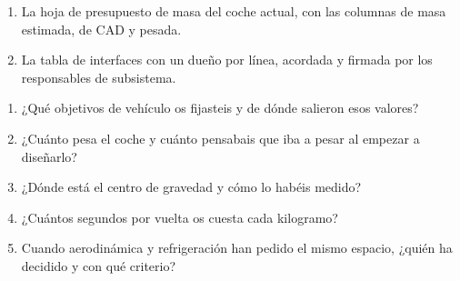 \begin{entregable}
\begin{enumerate}
  \item La hoja de presupuesto de masa del coche actual, con las columnas de masa
        estimada, de CAD y pesada.
  \item La tabla de interfaces con un dueño por línea, acordada y firmada por los
        responsables de subsistema.
\end{enumerate}
\end{entregable}

\begin{juez}
\begin{enumerate}
  \item ¿Qué objetivos de vehículo os fijasteis y de dónde salieron esos valores?
  \item ¿Cuánto pesa el coche y cuánto pensabais que iba a pesar al empezar a
        diseñarlo?
  \item ¿Dónde está el centro de gravedad y cómo lo habéis medido?
  \item ¿Cuántos segundos por vuelta os cuesta cada kilogramo?
  \item Cuando aerodinámica y refrigeración han pedido el mismo espacio, ¿quién
        ha decidido y con qué criterio?
\end{enumerate}
\end{juez}
